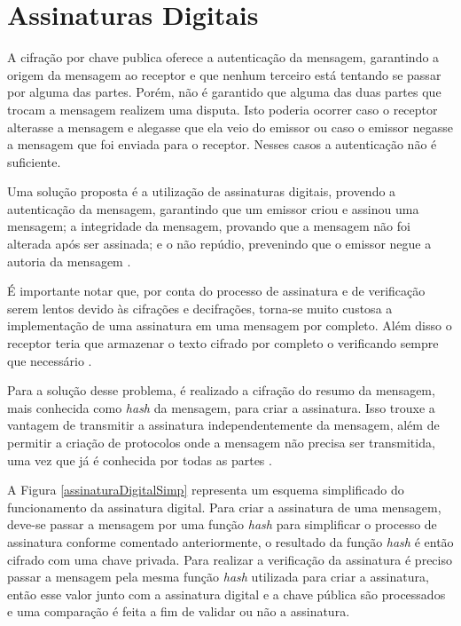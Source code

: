 \section{Assinaturas Digitais}

A cifração por chave publica oferece a autenticação da mensagem, garantindo a origem da mensagem ao receptor e que nenhum terceiro está tentando se passar por alguma das partes. Porém, não é garantido que alguma das duas partes que trocam a mensagem realizem uma disputa. Isto poderia ocorrer caso o receptor alterasse a mensagem e alegasse que ela veio do emissor ou caso o emissor negasse a mensagem que foi enviada para o receptor. Nesses casos a autenticação não é suficiente. 

Uma solução proposta é a utilização de assinaturas digitais, provendo a autenticação da mensagem, garantindo que um emissor criou e assinou uma mensagem; a integridade da mensagem, provando que a mensagem não foi alterada após ser assinada; e o não repúdio, prevenindo que o emissor negue a autoria da mensagem \cite{johnson2001elliptic}.

É importante notar que, por conta do processo de assinatura e de verificação serem lentos devido às cifrações e decifrações, torna-se muito custosa a implementação de uma assinatura em uma mensagem por completo. Além disso o receptor teria que armazenar o texto cifrado por completo o verificando sempre que necessário \cite{diffie1998}.

Para a solução desse problema, é realizado a cifração do resumo da mensagem, mais conhecida como \textit{hash} da mensagem, para criar a assinatura. Isso trouxe a vantagem de transmitir a assinatura independentemente da mensagem, além de permitir a criação de protocolos onde a mensagem não precisa ser transmitida, uma vez que já é conhecida por todas as partes \cite{diffie1998}.

A Figura \ref{assinaturaDigitalSimp} representa um esquema simplificado do funcionamento da assinatura digital. Para criar a assinatura de uma mensagem, deve-se passar a mensagem por uma função \textit{hash} para simplificar o processo de assinatura conforme comentado anteriormente, o resultado da função \textit{hash} é então cifrado com uma chave privada. Para realizar a verificação da assinatura é preciso passar a mensagem pela mesma função \textit{hash} utilizada para criar a assinatura, então esse valor junto com a assinatura digital e a chave pública são processados e uma comparação é feita a fim de validar ou não a assinatura.

